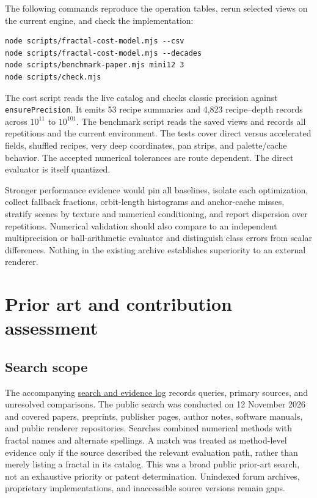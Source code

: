 \documentclass[11pt,a4paper]{article}
\numberwithin{equation}{section}
\newcommand{\code}[1]{\texttt{#1}}
\begin{document}
The following commands reproduce the operation tables, rerun selected
views on the current engine, and check the implementation:
\begin{Verbatim}[fontsize=\small]
node scripts/fractal-cost-model.mjs --csv
node scripts/fractal-cost-model.mjs --decades
node scripts/benchmark-paper.mjs mini12 3
node scripts/check.mjs
\end{Verbatim}
The cost script reads the live catalog and checks classic precision
against \code{ensurePrecision}. It emits 53 recipe summaries and
4,823 recipe--depth records across \(10^{11}\) to \(10^{101}\).
The benchmark script reads the saved views and records all repetitions
and the current environment. The tests cover direct versus accelerated
fields, shuffled recipes, very deep coordinates, pan strips, and
palette/cache behavior. The accepted numerical tolerances are route
dependent. The direct evaluator is itself quantized.

Stronger performance evidence would pin all baselines, isolate each
optimization, collect fallback fractions, orbit-length histograms and
anchor-cache misses, stratify scenes by texture and numerical
conditioning, and report dispersion over repetitions. Numerical
validation should also compare to an independent multiprecision or
ball-arithmetic evaluator and distinguish class errors from scalar
differences. Nothing in the existing archive establishes superiority
to an external renderer.

\section{Prior art and contribution assessment}\label{sec:prior}

\subsection{Search scope}

The accompanying \href{literature-review.md}{search and evidence log}
records queries, primary sources, and unresolved comparisons. The
public search was conducted on 12 November 2026 and covered papers,
preprints, publisher pages, author notes, software manuals, and
public renderer repositories. Searches combined numerical methods
with fractal names and alternate spellings. A match was treated as
method-level evidence only if the source described the relevant
evaluation path, rather than merely listing a fractal in its catalog.
This was a broad public prior-art search, not an exhaustive priority
or patent determination. Unindexed forum archives, proprietary
implementations, and inaccessible source versions remain gaps.
\end{document}
